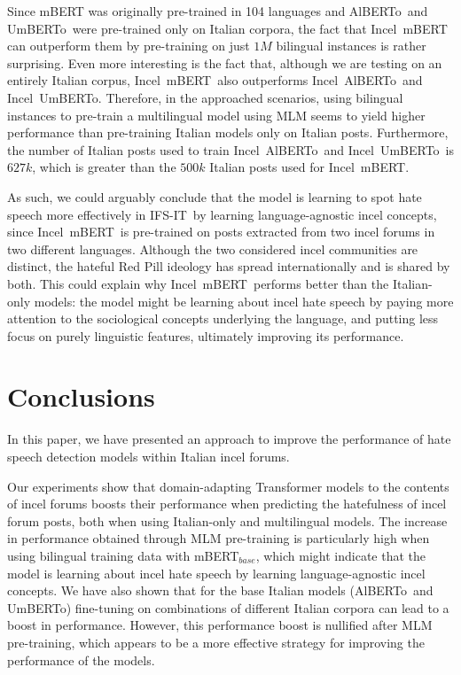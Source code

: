\documentclass[11pt]{article}
\newcommand{\dsITclassification}{IFS-IT}
\newcommand{\mbert}{\mbox{mBERT$_{base}$}}
\newcommand{\imbert}{\mbox{Incel mBERT}}
\newcommand{\umbert}{\mbox{UmBERTo}}
\newcommand{\albert}{\mbox{AlBERTo}}
\newcommand{\iumbert}{\mbox{Incel UmBERTo}}
\newcommand{\ialbert}{\mbox{Incel AlBERTo}}
\begin{document}
Since mBERT was originally pre-trained in 104 languages and \albert\, and \umbert\, were pre-trained only on Italian corpora, the fact that \imbert\, can outperform them by pre-training on just $1M$ bilingual instances is rather surprising. Even more interesting is the fact that, although we are testing on an entirely Italian corpus, \imbert\, also outperforms \ialbert\, and \iumbert. Therefore, in the approached scenarios, using bilingual instances to pre-train a multilingual model using MLM seems to yield higher performance than pre-training Italian models only on Italian posts. Furthermore, the number of Italian posts used to train \ialbert\, and \iumbert\, is $627k$, which is greater than the $500k$ Italian posts used for \imbert.

As such, we could arguably conclude that the model is learning to spot hate speech more effectively in \dsITclassification\, by learning language-agnostic incel concepts, since \imbert\, is pre-trained on posts extracted from two incel forums in two different languages. Although the two considered incel communities are distinct, the hateful Red Pill ideology has spread internationally and is shared by both. This could explain why \imbert\, performs better than the Italian-only models: the model might be learning about incel hate speech by paying more attention to the sociological concepts underlying the language, and putting less focus on purely linguistic features, ultimately improving its performance.


\section{Conclusions}

In this paper, we have presented an approach to improve the performance of hate speech detection models within Italian incel forums.

Our experiments show that domain-adapting Transformer models to the contents of incel forums boosts their performance when predicting the hatefulness of incel forum posts, both when using Italian-only and multilingual models. The increase in performance obtained through MLM pre-training is particularly high when using bilingual training data with \mbert, which might indicate that the model is learning about incel hate speech by learning language-agnostic incel concepts.
We have also shown that for the base Italian models (\albert\, and \umbert) fine-tuning on combinations of different Italian corpora can lead to a boost in performance. However, this performance boost is nullified after MLM pre-training, which appears to be a more effective strategy for improving the performance of the models.
\end{document}
